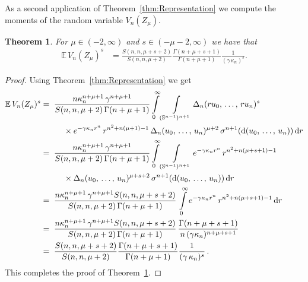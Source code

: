 \documentclass[10pt]{amsart}
\newtheorem{theo}{Theorem}[section]
\theoremstyle{definition}\newtheorem{defi}[theo]{Definition}\newtheorem{rema}[theo]{Remark}\newtheorem{exam}[theo]{Example}\newtheorem{exem}[theo]{Example}\newtheorem{nota}[theo]{Notation}
\newcommand{\Sp}{\mathbb S}
\newcommand{\EE}{\mathbb{E}\,}
\newcommand{\dd}{{\rm d}}
\begin{document}
As a second application of Theorem~\ref{thm:Representation} we compute the moments of the random variable $V_n(Z_\mu)$.

\begin{theo}\label{cor:MomentsAbstract}
For $\mu\in(-2,\infty)$ and $s\in(-\mu-2,\infty)$ we have that
\begin{align*}
\EE V_n(Z_\mu)^s &= \frac{S(n,n,\mu+s+2)}{S(n,n,\mu+2)}\frac{\Gamma(n+\mu+s+1)}{\Gamma(n+\mu+1)}\frac{1}{(\gamma\,\kappa_n)^s}.
\end{align*}
\end{theo}


\begin{proof}
Using Theorem~\ref{thm:Representation} we get
\begin{align*}
\EE V_n(Z_\mu)^s &=\;\frac{n\kappa_n^{n+\mu+1}\,\gamma^{n+\mu+1}}{S(n,n,\mu+2)\,\Gamma(n+\mu+1)}\int\limits_0^\infty\int\limits_{(\Sp^{n-1})^{n+1}}\Delta_n(ru_0,\,\ldots,\,ru_n)^s\\
&\mkern50mu\times e^{-\gamma\kappa_nr^n}\,r^{n^2+n(\mu+1)-1}\,\Delta_n(u_0,\,\ldots,\,u_n)^{\mu+2}\,\sigma^{n+1}(\dd(u_0,\,\ldots,\,u_n))\,\dd r\\
&=\;\frac{n\kappa_n^{n+\mu+1}\,\gamma^{n+\mu+1}}{S(n,n,\mu+2)\,\Gamma(n+\mu+1)}\int\limits_0^\infty\int\limits_{(\Sp^{n-1})^{n+1}}e^{-\gamma\kappa_nr^n}\,r^{n^2+n(\mu+s+1)-1}\\
&\mkern50mu\times\Delta_n(u_0,\,\ldots,\,u_n)^{\mu+s+2}\,\sigma^{n+1}(\dd(u_0,\,\ldots,\,u_n))\,\dd r\\
&=\;\frac{n\kappa_n^{n+\mu+1}\,\gamma^{n+\mu+1}S(n,n,\mu+s+2)}{S(n,n,\mu+2)\,\Gamma(n+\mu+1)}\,\int\limits_0^\infty e^{-\gamma\kappa_nr^n}\,r^{n^2+n(\mu+s+1)-1}\,\dd r\\
&=\;\frac{n\kappa_n^{n+\mu+1}\,\gamma^{n+\mu+1} S(n,n,\mu+s+2)}{S(n,n,\mu+2)\,\Gamma(n+\mu+1)}\,\frac{\Gamma(n+\mu+s+1)}{n\,(\gamma\kappa_n)^{n+\mu+s+1}}\\
&=\;\frac{S(n,n,\mu+s+2)}{S(n,n,\mu+2)}\frac{\Gamma(n+\mu+s+1)}{\Gamma(n+\mu+1)}\frac{1}{(\gamma\,\kappa_n)^s}\,.
\end{align*}
This completes the proof of Theorem~\ref{cor:MomentsAbstract}.
\end{proof}
\end{document}
